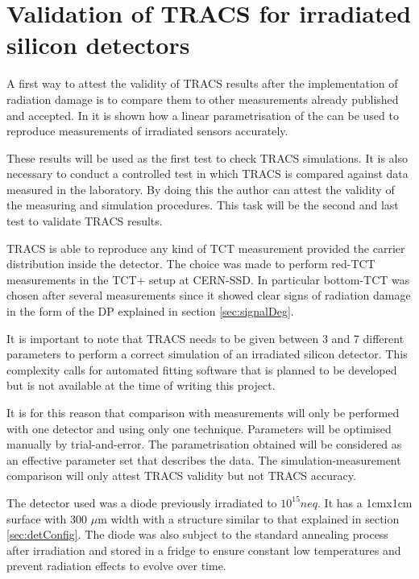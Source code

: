 \chapter{Validation of TRACS for irradiated silicon detectors}
\label{sec:TRACSvalidity}

A first way to attest the validity of TRACS results after the implementation of radiation damage is to compare them to other measurements already published and accepted. In \cite{Pholsen} it is shown how a linear parametrisation of the \neff can be used to reproduce measurements of irradiated sensors accurately.

These results will be used as the first test to check TRACS simulations. It is also necessary to conduct a controlled test in which TRACS is compared against data measured in the laboratory. By doing this the author can attest the validity of the measuring and simulation procedures. This task will be the second and last test to validate TRACS results.

TRACS is able to reproduce any kind of TCT measurement provided the carrier distribution inside the detector. The choice was made to perform red-TCT measurements in the TCT+ setup at CERN-SSD\cite{ssd}. In particular bottom-TCT was chosen after several measurements since it showed clear signs of radiation damage in the form of the DP explained in section \ref{sec:signalDeg}. 

It is important to note that TRACS needs to be given between 3 and 7 different parameters to perform a correct simulation of an irradiated silicon detector. This complexity calls for automated fitting software that is planned to be developed but is not available at the time of writing this project.

It is for this reason that comparison with measurements will only be performed with one detector and using only one technique. Parameters will be optimised manually by trial-and-error. The parametrisation obtained will be considered as an effective parameter set that describes the data. The simulation-measurement comparison will only attest TRACS validity but not TRACS accuracy.

The detector used was a diode previously irradiated to $10^{15} neq$. It has a  1cmx1cm surface with 300 $\mu$m width with a structure similar to that explained in section \ref{sec:detConfig}. The diode was also subject to the standard annealing process after irradiation and stored in a fridge to ensure constant low temperatures and prevent radiation effects to evolve over time. 


